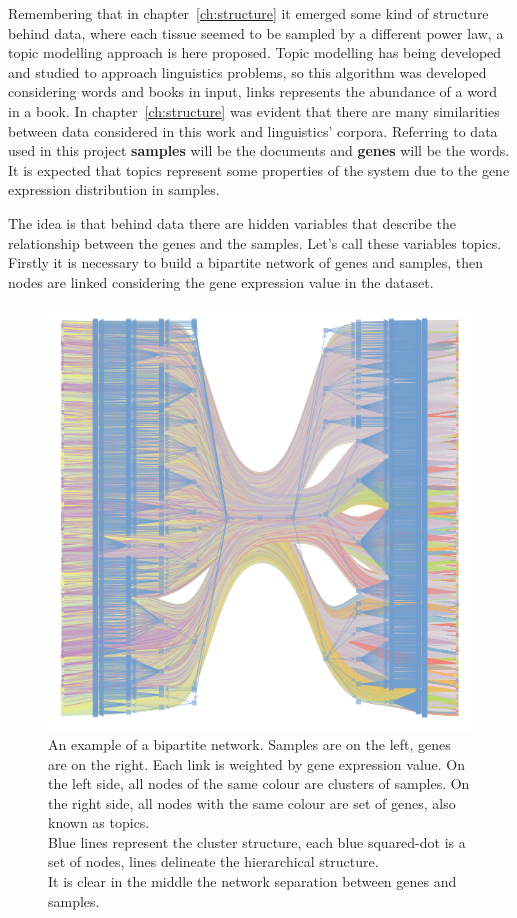 Remembering that in chapter~\ref{ch:structure} it emerged some kind of structure behind data, where each tissue seemed to be sampled by a different power law, a topic modelling approach is here proposed. Topic modelling has being developed and studied to approach linguistics problems, so this algorithm was developed considering words and books in input, links represents the abundance of a word in a book. In chapter~\ref{ch:structure} was evident that there are many similarities between data considered in this work and linguistics' corpora. Referring to data used in this project \textbf{samples} will be the documents and \textbf{genes} will be the words. It is expected that topics represent some properties of the system due to the gene expression distribution in samples.

The idea is that behind data there are hidden variables that describe the relationship between the genes and the samples. Let's call these variables topics.
Firstly it is necessary to build a bipartite network of genes and samples, then nodes are linked considering the gene expression value in the dataset.
\begin{figure}[htb!]
    \centering
    \includegraphics[width=0.7\linewidth]{pictures/topic/bipartite.pdf}
    \caption{An example of a bipartite network. Samples are on the left, genes are on the right. Each link is weighted by gene expression value. On the left side, all nodes of the same colour are clusters of samples. On the right side, all nodes with the same colour are set of genes, also known as topics.\\ 
    Blue lines represent the cluster structure, each blue squared-dot is a set of nodes, lines delineate the hierarchical structure.\\
    It is clear in the middle the network separation between genes and samples.}
    \label{fig:topic/bipartite}
\end{figure}

